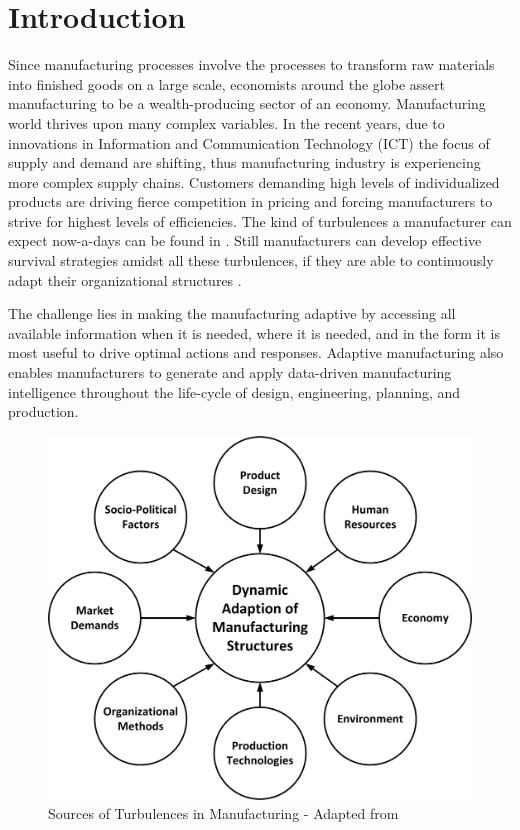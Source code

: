 \chapter{Introduction} \label{chap:introduction} Since manufacturing processes involve the processes to transform raw materials into finished goods on a large scale, economists around the globe assert manufacturing to be a wealth-producing sector of an economy. Manufacturing world thrives upon many complex variables. In the recent years, due to innovations in Information and Communication Technology (\acs{ICT}) the focus of supply and demand are shifting, thus manufacturing industry is experiencing more complex supply chains. Customers demanding high levels of individualized products are driving fierce competition in pricing and forcing manufacturers to strive for highest levels of efficiencies. The kind of turbulences a manufacturer can expect now-a-days can be found in . Still manufacturers can develop effective survival strategies amidst all these turbulences, if they are able to continuously adapt their organizational structures \cite{WESTKAMP}.

The challenge lies in making the manufacturing adaptive by accessing all available information when it is needed, where it is needed, and in the form it is most useful to drive optimal actions and responses. Adaptive manufacturing also enables manufacturers to generate and apply data-driven manufacturing intelligence throughout the life-cycle of design, engineering, planning, and production.

\begin{figure}[h!]
	\includegraphics[scale=0.35]{./gfx/addmanustr}
	\centering
	\caption{Sources of Turbulences in Manufacturing - Adapted from \cite{WESTKAMP}}
	\label{fig:1.1}
\end{figure}

